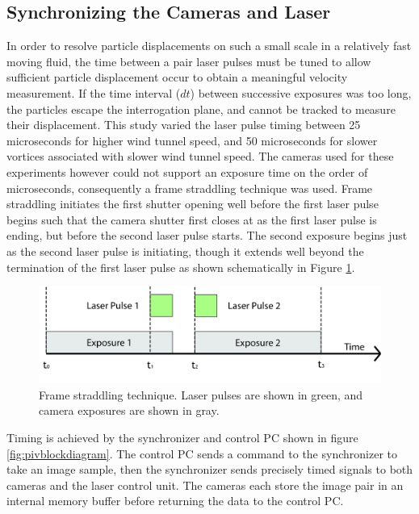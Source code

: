 \subsection{Synchronizing the Cameras and Laser}
In order to resolve particle displacements on such a small scale in a 
relatively fast moving fluid, the time between a pair laser pulses must be 
tuned to allow sufficient particle displacement occur to obtain a meaningful 
velocity measurement. If the time interval ($dt$) between successive exposures 
was too long, the particles escape the interrogation plane, and cannot be 
tracked to measure their displacement. This study varied the laser pulse timing 
between 25 microseconds for higher wind tunnel speed, and 50 microseconds for 
slower vortices associated with slower wind tunnel speed. The cameras used for 
these experiments however could not support an exposure time on the order of 
microseconds, consequently a frame straddling technique was used. Frame 
straddling initiates the first shutter opening well before the first laser 
pulse begins such that the camera shutter first closes at as the first laser 
pulse is ending, but before the second laser pulse starts. The second exposure 
begins just as the second laser pulse is initiating, though it extends well 
beyond the termination of the first laser pulse as shown schematically in 
Figure \ref{fig:frame_straddling}. 

\begin{figure}
	\centering
	\includegraphics[width=5.5in]{figs/piv_method/frame_straddling}
	\caption{Frame straddling technique. Laser pulses are shown in green, and 
		camera exposures are shown in gray.}
	\label{fig:frame_straddling}
\end{figure}

Timing is achieved by the synchronizer and control PC shown in figure 
\ref{fig:pivblockdiagram}. The control PC sends a command to the synchronizer 
to take an image sample, then the synchronizer sends precisely timed signals to 
both cameras and the laser control unit. The cameras each store the image pair 
in an internal memory buffer before returning the data to the control PC.


